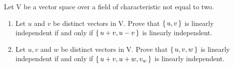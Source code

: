 Let $\mathrm{V}$ be a vector space over a field of characteristic not equal to two.

\begin{enumerate}
	\item Let $u$ and $v$ be distinct vectors in $\mathrm{V}$. Prove that $\left\{ \,u,v \,\right\}$ is linearly independent if and only if $\left\{ \,u+v,u-v \,\right\}$ is linearly independent.
	\item Let $u,v$ and $w$ be distinct vectors in $\mathrm{V}$. Prove that $\left\{ \,u,v,w \,\right\}$ is linearly independent if and only if $\left\{ \,u+v,u+w,v_w \,\right\}$ is linearly independent.
\end{enumerate}

\begin{tcolorbox}
	\begin{solution}
		
	\end{solution}
\end{tcolorbox}